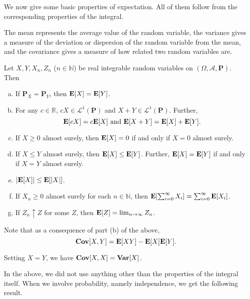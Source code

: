 We now give some basic properties of expectation. All of them follow from the corresponding properties of the integral.

\vspace{2mm}
The mean represents the average value of the random variable, the variance gives a measure of the deviation or dispersion of the random variable from the mean, and the covariance gives a measure of how related two random variables are.

\begin{theorem}
\label{expectation rules}
    Let $X,Y,X_n,Z_n$ ($n\in\mathbb{N}$) be real integrable random variables on $(\Omega,\mathcal{A},\textbf{P})$. Then
    \begin{enumerate}[(a)]
        \item If $\textbf{P}_X=\textbf{P}_Y$, then $\textbf{E}[X]=\textbf{E}[Y]$.
        \item For any $c\in\mathbb{R}$, $cX\in\mathcal{L}^1(\textbf{P})$ and $X+Y\in\mathcal{L}^1(\textbf{P})$. Further,
        $$\textbf{E}[cX]=c\textbf{E}[X]\text{ and }\textbf{E}[X+Y]=\textbf{E}[X]+\textbf{E}[Y].$$
        \item If $X\geq 0$ almost surely, then $\textbf{E}[X]=0$ if and only if $X=0$ almost surely.
        \item If $X\leq Y$ almost surely, then $\textbf{E}[X]\leq\textbf{E}[Y]$. Further, $\textbf{E}[X]=\textbf{E}[Y]$ if and only if $X=Y$ almost surely.
        \item $|\textbf{E}[X]|\leq\textbf{E}[|X|]$.
        \item If $X_n\geq 0$ almost surely for each $n\in\mathbb{N}$, then $\textbf{E}[\sum_{i=0}^\infty X_i] = \sum_{i=0}^\infty \textbf{E}[X_i]$.
        \item If $Z_n\uparrow Z$ for some $Z$, then $\textbf{E}[Z]=\lim_{n\to\infty}Z_n$.
    \end{enumerate}
\end{theorem}

Note that as a consequence of part (b) of the above,
$$\operatorname{\textbf{Cov}}[X,Y]=\textbf{E}[XY]-\textbf{E}[X]\textbf{E}[Y].$$

Setting $X=Y$, we have $\operatorname{\textbf{Cov}}[X,X]=\operatorname{\textbf{Var}}[X]$.

\vspace{2mm}
In the above, we did not use anything other than the properties of the integral itself. When we involve probability, namely independence, we get the following result.


